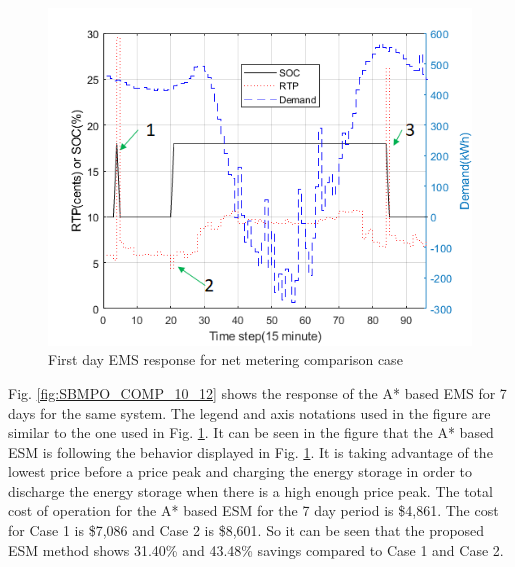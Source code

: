 \begin{figure}[!ht]
    \centering
    \includegraphics[width = \linewidth]{figs/SBMPO_COMP_1_day.png}
    \caption{First day EMS response for net metering comparison case}
    \label{fig:SBMPO_COMP_1_day}
\end{figure}

Fig. \ref{fig:SBMPO_COMP_10_12} shows the response of the A* based EMS for 7 days for the same system. The legend and axis notations used in the figure are similar to the one used in Fig. \ref{fig:SBMPO_COMP_1_day}. It can be seen in the figure that the A* based ESM is following the behavior displayed in Fig. \ref{fig:SBMPO_COMP_1_day}. It is taking advantage of the lowest price before a price peak and charging the energy storage in order to discharge the energy storage when there is a high enough price peak. The total cost of operation for the A* based ESM for the 7 day period is \$4,861. The cost for Case 1 is \$7,086 and Case 2 is \$8,601. So it can be seen that the proposed ESM method shows 31.40\% and  43.48\% savings compared to Case 1 and Case 2.

